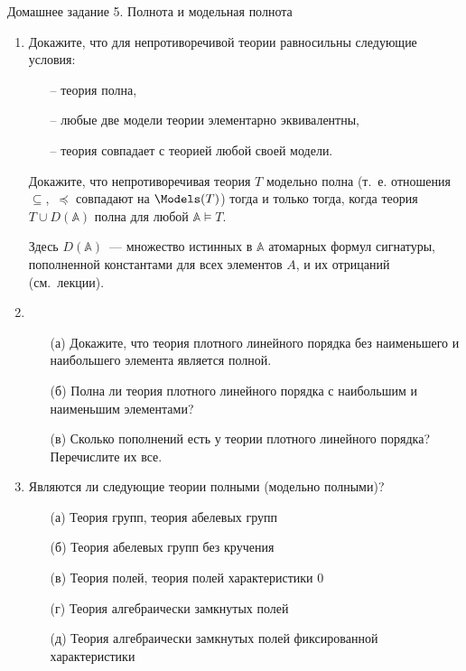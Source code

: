 \documentclass[a4paper,11pt]{article}
\begin{document}
\begin{center}
	\Large Домашнее задание 5. Полнота и модельная полнота
\end{center}

\begin{enumerate}
\item Докажите, что для непротиворечивой теории равносильны следующие условия:
	\begin{enumerate}
		\item[–] теория полна,
		\item[–] любые две модели теории элементарно эквивалентны,
		\item[–] теория совпадает с теорией любой своей модели.
	\end{enumerate}

Докажите, что непротиворечивая теория $T$ модельно полна (т.~е. отношения $\subseteq$,~$\preceq$ совпадают на $\Models(T)$) тогда и только тогда, когда теория $T\cup D(\mathbb{A})$ полна для любой $\mathbb{A}\models T$.

Здесь $D(\mathbb{A})$~— множество истинных в $\mathbb{A}$ атомарных формул сигнатуры, пополненной константами для всех элементов $A$, и их отрицаний (см.~лекции).

\item \begin{enumerate}
	\item[(а)] Докажите, что теория плотного линейного порядка без наименьшего и наибольшего элемента является полной.
	\item[(б)] Полна ли теория плотного линейного порядка с наибольшим и наименьшим элементами?
	\item[(в)] Сколько пополнений есть у теории плотного линейного порядка? Перечислите их все.
\end{enumerate}

\item Являются  ли следующие теории полными (модельно полными)?
   \begin{enumerate}
	\item[(а)] Теория групп, теория абелевых групп
	\item[(б)] Теория абелевых групп без кручения
	\item[(в)] Теория полей, теория полей характеристики 0
	\item[(г)] Теория алгебраически замкнутых полей
	\item[(д)] Теория алгебраически замкнутых полей фиксированной характеристики
   \end{enumerate} 


\end{enumerate}
\end{document}
